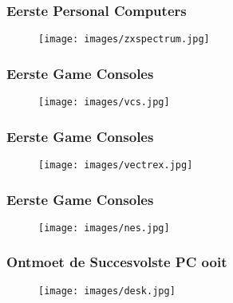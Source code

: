 \documentclass[aspectratio=43]{uva-inf-presentation}
\begin{document}
\begin{frame}
\frametitle{Eerste Personal Computers}

\begin{figure}
\texttt{[image: images/zxspectrum.jpg]}
\end{figure}

\end{frame}


\begin{frame}
\frametitle{Eerste Game Consoles}

\begin{figure}
\texttt{[image: images/vcs.jpg]}
\end{figure}

\end{frame}


\begin{frame}
\frametitle{Eerste Game Consoles}

\begin{figure}
\texttt{[image: images/vectrex.jpg]}
\end{figure}

\end{frame}


\begin{frame}
\frametitle{Eerste Game Consoles}

\begin{figure}
\texttt{[image: images/nes.jpg]}
\end{figure}

\end{frame}


\begin{frame}
\frametitle{Ontmoet de Succesvolste PC ooit}

\begin{figure}
\texttt{[image: images/desk.jpg]}
\end{figure}

\end{frame}

\end{document}
